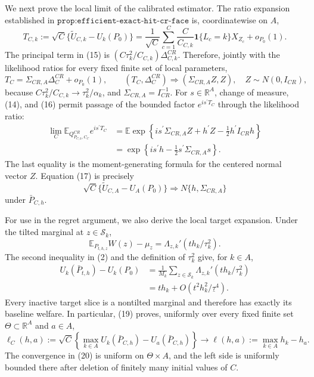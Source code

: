 We next prove the local limit of the calibrated estimator.  The ratio expansion established in \(\texttt{prop:efficient-exact-hit-cr-face}\) is, coordinatewise on \(A\),
\[
 T_{C,k}:=\sqrt C\{\widetilde U_{C,k}-U_k(P_0)\}
 =\frac1{\sqrt C}\sum_{c=1}^C
   \frac{C}{C_{C,k}}\mathbf1\{L_c=k\}X_{Z_c}+o_{P_0}(1).        \tag{15}
\]
The principal term in (15) is
\((C\tau_k^2/C_{C,k})\Delta_{C,k}^{CR}\).  Therefore, jointly with the likelihood ratios for every fixed finite set of local parameters,
\[
 T_C=\Sigma_{CR,A}\Delta_C^{CR}+o_{P_0}(1),
 \qquad
 (T_C,\Delta_C^{CR})\Rightarrow
 (\Sigma_{CR,A}Z,Z),\quad Z\sim N(0,I_{CR}),                    \tag{16}
\]
because \(C\tau_k^2/C_{C,k}\to\tau_k^2/\alpha_k\), and \(\Sigma_{CR,A}=I_{CR}^{-1}\).  For \(s\in\mathbb R^A\), change of measure, (14), and (16) permit passage of the bounded factor \(e^{is^{\prime}T_C}\) through the likelihood ratio:
\[
 \begin{aligned}
 \lim_C\mathbb E_{Q^{CR}_{\bar P_{C,h},C_C}}e^{is^{\prime}T_C}
 &=\mathbb E\exp\!\left\{is^{\prime}\Sigma_{CR,A}Z
                   +h^{\prime}Z-\frac{1}{2}h^{\prime}I_{CR}h\right\}\\
 &=\exp\!\left\{is^{\prime}h-\frac{1}{2}s^{\prime}\Sigma_{CR,A}s\right\}.
 \end{aligned}                                                   \tag{17}
\]
The last equality is the moment-generating formula for the centered normal vector \(Z\).  Equation (17) is precisely
\[
 \sqrt C\{\widetilde U_{C,A}-U_A(P_0)\}
 \Rightarrow N\{h,\Sigma_{CR,A}\}                              \tag{18}
\]
under \(\bar P_{C,h}\).

For use in the regret argument, we also derive the local target expansion.  Under the tilted marginal at \(z\in\mathcal S_k\),
\[
 \mathbb E_{P_{t,h,z}}W(z)-\mu_z
 =\Lambda_{z,k}'(t h_k/\tau_k^2).
\]
The second inequality in (2) and the definition of \(\tau_k^2\) give, for \(k\in A\),
\[
 \begin{aligned}
 U_k(\bar P_{t,h})-U_k(P_0)
 &=\frac1{M_k}\sum_{z\in\mathcal S_k}
   \Lambda_{z,k}'(t h_k/\tau_k^2)\\
 &=t h_k+O(t^2h_k^2/\underline\tau^4).                          
 \end{aligned}                                                   \tag{19}
\]
Every inactive target slice is a nontilted marginal and therefore has exactly its baseline welfare.  In particular, (19) proves, uniformly over every fixed finite set \(\Theta\subset\mathbb R^A\) and \(a\in A\),
\[
 \ell_C(h,a):=\sqrt C\!\left\{
   \max_{k\in A}U_k(\bar P_{C,h})-U_a(\bar P_{C,h})\right\}
 \longrightarrow
 \ell(h,a):=\max_{k\in A}h_k-h_a.                              \tag{20}
\]
The convergence in (20) is uniform on \(\Theta\times A\), and the left side is uniformly bounded there after deletion of finitely many initial values of \(C\).

